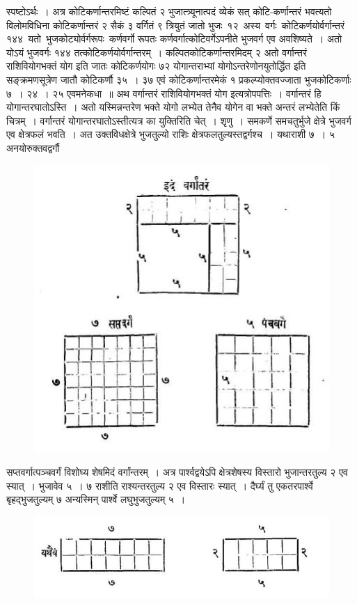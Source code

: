 \documentclass[11pt, openany]{book}
\begin{document}
स्पष्टोऽर्थः~। अत्र कोटिकर्णान्तरमिष्टं कल्पितं २ भुजात्त्र्यूनात्पदं व्येकं सत् 
कोटि-कर्णान्तरं भवत्यतो विलोमविधिना कोटिकर्णान्तरं २ सैकं ३ वर्गितं ९ 
त्रियुतं जातो भुजः \,१२ \,अस्य \,वर्गः \,कोटिकर्णयोर्वर्गान्तरं \,१४४ \,यतो \,भुजकोट्योर्वर्गरूपः \,कर्णवर्गो रूपतः कर्णवर्गात्कोटिवर्गेऽपनीते भुजवर्ग एव अवशिष्यते~। अतो योऽयं भुजवर्गः १४४ तत्कोटिकर्णयोर्वर्गान्तरम्~। कल्पितकोटिकर्णान्तरमिदम् २ अतो वर्गान्तरं राशिवियोगभक्तं योग इति जातः कोटिकर्णयोगः ७२ योगान्तराभ्यां योगोऽन्तरेणोनयुतोर्द्धित इति सङ्क्रमणसूत्रेण जातौ कोटिकर्णौ ३५~। ३७ एवं कोटिकर्णान्तरमेकं १ प्रकल्प्योक्तवज्जाता भुजकोटिकर्णाः ७~। २४~। २५ एवमनेकधा~॥
 \newpage%
 अथ वर्गान्तरं राशिवियोगभक्तं योग इत्यत्रोपपत्तिः~। वर्गान्तरं हि 
योगान्तरघातोऽस्ति~। अतो यस्मिन्नन्तरेण भक्ते योगो लभ्येत तेनैव योगेन वा 
भक्ते अन्तरं लभ्येतेति किं चित्रम्~। वर्गान्तरं योगान्तरघातोऽस्तीत्यत्र का 
युक्तिरिति चेत्~। शृणु~। समकर्णे समचतुर्भुजे क्षेत्रे भुजवर्ग एव क्षेत्रफलं 
भवति~। अत उक्तविधक्षेत्रे भुजतुल्यो राशिः क्षेत्रफलतुल्यस्तद्वर्गश्च~। 
यथाराशी ७~। ५ अनयोरुक्तवद्वर्गौ 
\begin{figure}[h!]
    \centering
    \includegraphics[scale=0.8]{Graphics/Capture5.JPG}
\end{figure}

\noindent सप्तवर्गात्पञ्चवर्गं विशोघ्य शेषमिदं वर्गांन्तरम्~। अत्र पार्श्वद्वयेऽपि क्षेत्रशेषस्य विस्तारो भुजान्तरतुल्य २ एव स्यात्~। भुजावेव ५~। ७ राशीति राश्यन्तरतुल्य २ एव विस्तारः स्यात्~। दैर्घ्यं तु एकतरपार्श्वे बृहद्भुजतुल्यम् ७ 
अन्यस्मिन् पार्श्वे लघुभुजतुल्यम् ५~।
\newpage
\begin{figure}[h!]
    \centering
    \includegraphics[scale=0.65]{Graphics/Capture6.JPG}
\end{figure}
\vspace{-2mm}
\end{document}
